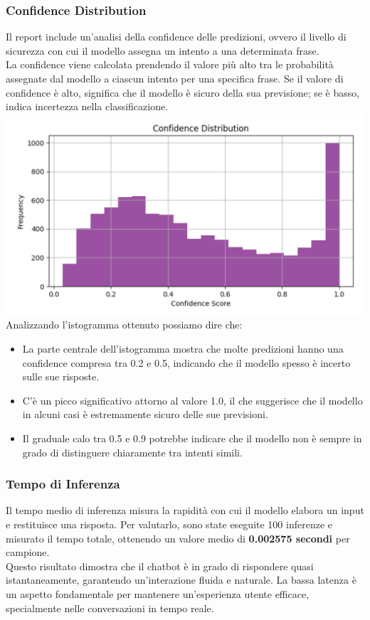 \documentclass[12pt, letterpaper]{article}
\begin{document}
\subsubsection{Confidence Distribution}
Il report include un'analisi della confidence delle predizioni, ovvero il livello di sicurezza con cui il modello assegna un intento a una determinata frase.\\
La confidence viene calcolata prendendo il valore più alto tra le probabilità assegnate dal modello a ciascun intento per una specifica frase. Se il valore di confidence è alto, significa che il modello è sicuro della sua previsione; se è basso, indica incertezza nella classificazione.\\
\includegraphics[width=1\textwidth]{immagini/conf.png} \\
Analizzando l’istogramma ottenuto possiamo dire che:
\begin{itemize}
	\item La parte centrale dell'istogramma mostra che molte predizioni hanno una confidence compresa tra 0.2 e 0.5, indicando che il modello spesso è incerto sulle sue risposte.
	\item C'è un picco significativo attorno al valore 1.0, il che suggerisce che il modello in alcuni casi è estremamente sicuro delle sue previsioni.
	\item Il graduale calo tra 0.5 e 0.9 potrebbe indicare che il modello non è sempre in grado di distinguere chiaramente tra intenti simili.
\end{itemize}

\subsubsection{Tempo di Inferenza}
Il tempo medio di inferenza misura la rapidità con cui il modello elabora un input e restituisce una risposta. Per valutarlo, sono state eseguite 100 inferenze e misurato il tempo totale, ottenendo un valore medio di \textbf{0.002575 secondi} per campione.\\
Questo risultato dimostra che il chatbot è in grado di rispondere quasi istantaneamente, garantendo un’interazione fluida e naturale. La bassa latenza è un aspetto fondamentale per mantenere un’esperienza utente efficace, specialmente nelle conversazioni in tempo reale.
\end{document}
